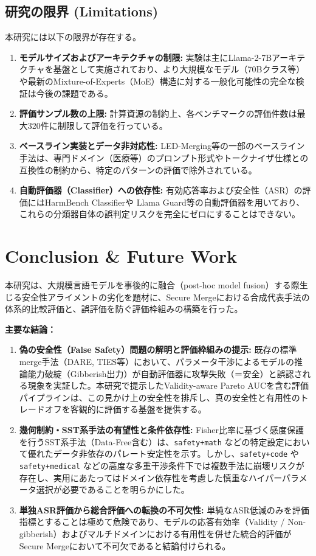 \documentclass{article}
\begin{document}
\subsection{研究の限界 (Limitations)}
本研究には以下の限界が存在する。
\begin{enumerate}
    \item \textbf{モデルサイズおよびアーキテクチャの制限:} 実験は主にLlama-2-7Bアーキテクチャを基盤として実施されており、より大規模なモデル（70Bクラス等）や最新のMixture-of-Experts（MoE）構造に対する一般化可能性の完全な検証は今後の課題である。
    \item \textbf{評価サンプル数の上限:} 計算資源の制約上、各ベンチマークの評価件数は最大320件に制限して評価を行っている。
    \item \textbf{ベースライン実装とデータ非対応性:} LED-Merging等の一部のベースライン手法は、専門ドメイン（医療等）のプロンプト形式やトークナイザ仕様との互換性の制約から、特定のパターンの評価で除外されている。
    \item \textbf{自動評価器（Classifier）への依存性:} 有効応答率および安全性（ASR）の評価にはHarmBench Classifierや Llama Guard等の自動評価器を用いており、これらの分類器自体の誤判定リスクを完全にゼロにすることはできない。
\end{enumerate}

\section{Conclusion \& Future Work}

本研究は、大規模言語モデルを事後的に融合（post-hoc model fusion）する際生じる安全性アライメントの劣化を題材に、Secure Mergeにおける合成代表手法の体系的比較評価と、誤評価を防ぐ評価枠組みの構築を行った。

\textbf{主要な結論：}
\begin{enumerate}
    \item \textbf{偽の安全性（False Safety）問題の解明と評価枠組みの提示:} 既存の標準merge手法（DARE, TIES等）において、パラメータ干渉によるモデルの推論能力破綻（Gibberish出力）が自動評価器に攻撃失敗（＝安全）と誤認される現象を実証した。本研究で提示したValidity-aware Pareto AUCを含む評価パイプラインは、この見かけ上の安全性を排斥し、真の安全性と有用性のトレードオフを客観的に評価する基盤を提供する。
    \item \textbf{幾何制約・SST系手法の有望性と条件依存性:} Fisher比率に基づく感度保護を行うSST系手法（Data-Free含む）は、\texttt{safety+math} などの特定設定において優れたデータ非依存のパレート安定性を示す。しかし、\texttt{safety+code} や \texttt{safety+medical} などの高度な多重干渉条件下では複数手法に崩壊リスクが存在し、実用にあたってはドメイン依存性を考慮した慎重なハイパーパラメータ選択が必要であることを明らかにした。
    \item \textbf{単独ASR評価から総合評価への転換の不可欠性:} 単純なASR低減のみを評価指標とすることは極めて危険であり、モデルの応答有効率（Validity / Non-gibberish）およびマルチドメインにおける有用性を併せた統合的評価がSecure Mergeにおいて不可欠であると結論付けられる。
\end{enumerate}
\end{document}
